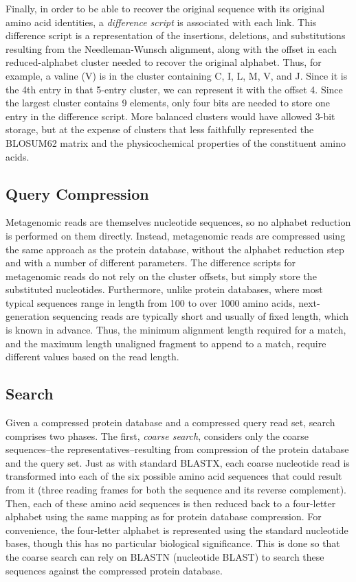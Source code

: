 \documentclass{amsbook}
\theoremstyle{definition}
\theoremstyle{remark}
\numberwithin{equation}{section}
\begin{document}
Finally, in order to be able to recover the original sequence with its original
amino acid identities, a \textit{difference script} is associated with each
link.
This difference script is a representation of the insertions, deletions, and
substitutions resulting from the Needleman-Wunsch alignment, along with the
offset in each reduced-alphabet cluster needed to recover the original alphabet.
Thus, for example, a valine (V) is in the cluster containing C, I, L, M, V, and 
J.
Since it is the 4th entry in that 5-entry cluster, we can represent it with
the offset 4.
Since the largest cluster contains 9 elements, only four bits are needed to
store one entry in the difference script.
More balanced clusters would have allowed 3-bit storage, but at the expense of
clusters that less faithfully represented the BLOSUM62 matrix and the
physicochemical properties of the constituent amino acids.

\subsection*{Query Compression}

Metagenomic reads are themselves nucleotide sequences, so no alphabet reduction
is performed on them directly.
Instead, metagenomic reads are compressed using the same approach as the
protein database, without the alphabet reduction step and with a number of
different parameters.
The difference scripts for metagenomic reads do not rely on the cluster offsets,
but simply store the substituted nucleotides.
Furthermore, unlike protein databases, where most typical sequences range in 
length from 100 to over 1000 amino acids, next-generation sequencing reads are 
typically short and usually of fixed length, which is known in advance.
Thus, the minimum alignment length required for a match, and the maximum
length unaligned fragment to append to a match, require different values based
on the read length.

\subsection*{Search}

Given a compressed protein database and a compressed query read set, search
comprises two phases.
The first, \emph{coarse search}, considers only the coarse sequences--the
representatives--resulting from compression of the protein database and the
query set.
Just as with standard BLASTX, each coarse nucleotide read is transformed into 
each of the six possible amino acid sequences that could result from it (three 
reading frames for both the sequence and its reverse complement).
Then, each of these amino acid sequences is then reduced back to a four-letter
alphabet using the same mapping as for protein database compression.
For convenience, the four-letter alphabet is represented using the standard
nucleotide bases, though this has no particular biological significance.
This is done so that the coarse search can rely on BLASTN (nucleotide BLAST) to
search these sequences against the compressed protein database.
\end{document}
